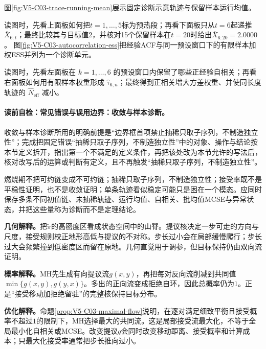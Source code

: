 图\ref{fig:V5-C03-trace-running-mean}展示固定诊断示意轨迹与保留样本运行均值。

\FloatBarrier
读图时，先看上面板如何把$t=1,\ldots,5$标为预热段；再看下面板只从$t=6$起递推$\overline X_{6:t}$；最终比较其与目标值2，并核对15个保留样本在$t=20$时给出$\overline X_{6:20}=2.0000$。
图\ref{fig:V5-C03-autocorrelation-ess}把经验ACF与同一预设窗口下的有限样本加权ESS并列为一个诊断单元。

\FloatBarrier
读图时，先看左面板在 $k=1,\ldots,6$ 的预设窗口内保留了哪些正经验自相关；再看右面板如何用有限样本权重形成 $\widehat\tau_{6,n}$；最终得到正相关增大方差权重、并使同长度轨迹的 $\widehat N_{\mathrm{eff}}$ 减小。

\paragraph{读前自检：常见错误与误用边界：收敛与样本诊断。}收敛与样本诊断所用的明确前提是“边界框首项禁止抽稀只取子序列，不制造独立性”；完成把固定错误“抽稀只取子序列，不制造独立性”中的对象、操作与结论按本节定义拆开，指出第一个不满足的定义条件，再把该处改为本节允许的写法后，核对改写后的运算或判断有定义，且不再触发“抽稀只取子序列，不制造独立性”。\par

\begin{warningbox}
燃烧期不把可约链变成不可约链；抽稀只取子序列，不制造独立性；接受率既不是平稳性证明，也不是收敛证明；单条轨迹看似稳定可能只是困在一个模态。应同时保存多条不同初值链、未抽稀轨迹、运行均值、自相关、批均值MCSE与异常状态，并把这些量称为诊断而不是定理结论。
\end{warningbox}

\label{struct:V5-C03-CH14}
\textbf{几何解释。}把$\widetilde\pi$的高密度区看成状态空间中的山脊。提议核决定一步可走的方向与尺度，接受规则校正地形高低与提议的不对称。步长过小会在局部缓慢爬行；步长过大会频繁撞到低密度区而留在原地。几何直觉用于调参，但目标保持仍由双向流证明。

\label{struct:V5-C03-CH15}
\textbf{概率解释。}MH先生成有向提议流$g(x,y)$，再把每对反向流削减到共同值$\min\{g(x,y),g(y,x)\}$。多出的正向流变成拒绝自环，因此总概率仍为$1$。正是“接受移动加拒绝留驻”的完整核保持目标分布。

\label{struct:V5-C03-CH16}
\textbf{优化解释。}命题\ref{prop:V5-C03-maximal-flow}说明，在逐对满足细致平衡且接受概率不超过$1$的限制下，MH选择最大的共同流。这是局部接受流最大化，不等于全局最小化自相关或MCSE。改变提议$q$会同时改变移动距离、接受概率和计算成本；只最大化接受率通常把步长推向过小。

